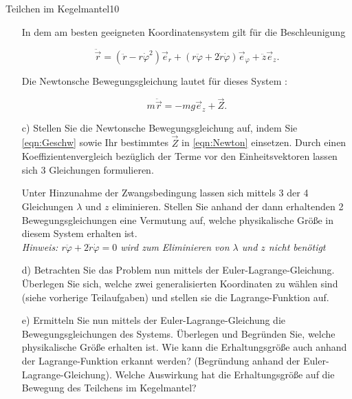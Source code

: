 \begin{exercise}{Teilchen im Kegelmantel}{10}
\begin{enumerate}
    \item[\bullet]In dem am besten geeigneten Koordinatensystem gilt für die Beschleunigung

    \begin{equation}
      \ddot{\vec{r}} = ( \ddot{r}-r\dot{\varphi}^2)\vec{e}_{r} + (r\ddot{\varphi}
      + 2\dot{r}\dot{\varphi})\vec{e}_{\varphi} + \ddot{z}\vec{e}_{z}.
      \label{eqn:Geschw}
    \end{equation}

    Die Newtonsche Bewegungsgleichung lautet für dieses System :

    \begin{equation}
      m \ddot{\vec{r}} = - mg\vec{e}_{z} + \vec{Z}.
      \label{eqn:Newton}
    \end{equation}

    \item[c)] Stellen Sie die Newtonsche Bewegungsgleichung auf, indem Sie
    \eqref{eqn:Geschw} sowie Ihr bestimmtes $\vec{Z}$ in \eqref{eqn:Newton}
    einsetzen. Durch einen Koeffizientenvergleich bezüglich der Terme vor den
    Einheitsvektoren lassen sich 3 Gleichungen formulieren.

    Unter Hinzunahme der
    Zwangsbedingung lassen sich mittels 3 der 4 Gleichungen $\lambda$ und $z$
    eliminieren. Stellen Sie anhand der dann erhaltenden 2 Bewegungsgleichungen
    eine Vermutung auf, welche physikalische Grö\ss{}e in diesem System erhalten ist.
    \\
    \textit{Hinweis: $r\ddot{\varphi} + 2\dot{r}\dot{\varphi} = 0$ wird zum Eliminieren
    von $\lambda$ und $z$ nicht benötigt}

    \item[d)] Betrachten Sie das Problem nun mittels der Euler-Lagrange-Gleichung.
    Überlegen Sie sich, welche zwei generalisierten Koordinaten zu wählen sind
    (siehe vorherige Teilaufgaben) und stellen sie die Lagrange-Funktion auf.

    \item[e)] Ermitteln Sie nun mittels der Euler-Lagrange-Gleichung die Bewegungsgleichungen
    des Systems. Überlegen und Begründen Sie, welche physikalische Grö\ss{}e erhalten
    ist. Wie kann die Erhaltungsgrö\ss{}e auch anhand der Lagrange-Funktion erkannt
    werden? (Begründung anhand der Euler-Lagrange-Gleichung). Welche Auswirkung
    hat die Erhaltungsgrö\ss{}e auf die Bewegung des Teilchens im Kegelmantel?

  \end{enumerate}
\end{exercise}
